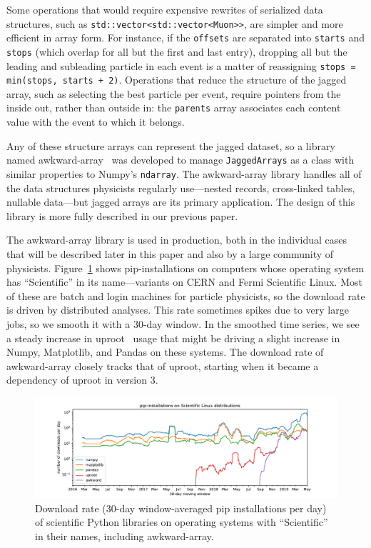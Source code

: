 \documentclass[a4paper]{jpconf}
\begin{document}
Some operations that would require expensive rewrites of serialized data structures, such as {\tt std::vector<std::vector<Muon>>}, are simpler and more efficient in array form. For instance, if the {\tt offsets} are separated into {\tt starts} and {\tt stops} (which overlap for all but the first and last entry), dropping all but the leading and subleading particle in each event is a matter of reassigning {\tt stops = min(stops, starts + 2)}. Operations that reduce the structure of the jagged array, such as selecting the best particle per event, require pointers from the inside out, rather than outside in: the {\tt parents} array associates each content value with the event to which it belongs.

Any of these structure arrays can represent the jagged dataset, so a library named awkward-array~\cite{awkward} was developed to manage {\tt JaggedArrays} as a class with similar properties to Numpy's {\tt ndarray}. The awkward-array library handles all of the data structures physicists regularly use---nested records, cross-linked tables, nullable data---but jagged arrays are its primary application. The design of this library is more fully described in our previous paper\cite{2019EPJWC}.

The awkward-array library is used in production, both in the individual cases that will be described later in this paper and also by a large community of physicists. Figure~\ref{fig:uproot} shows pip-installations on computers whose operating system has ``Scientific'' in its name---variants on CERN and Fermi Scientific Linux. Most of these are batch and login machines for particle physicists, so the download rate is driven by distributed analyses. This rate sometimes spikes due to very large jobs, so we smooth it with a 30-day window. In the smoothed time series, we see a steady increase in uproot~\cite{uproot} usage that might be driving a slight increase in Numpy, Matplotlib, and Pandas on these systems. The download rate of awkward-array closely tracks that of uproot, starting when it became a dependency of uproot in version 3.

\begin{figure}
\includegraphics[width=\linewidth]{pip-scientificlinux-uproot.pdf}

\caption{Download rate (30-day window-averaged pip installations per day) of scientific Python libraries on operating systems with ``Scientific'' in their names, including awkward-array. \label{fig:uproot}}
\end{figure}
\end{document}
